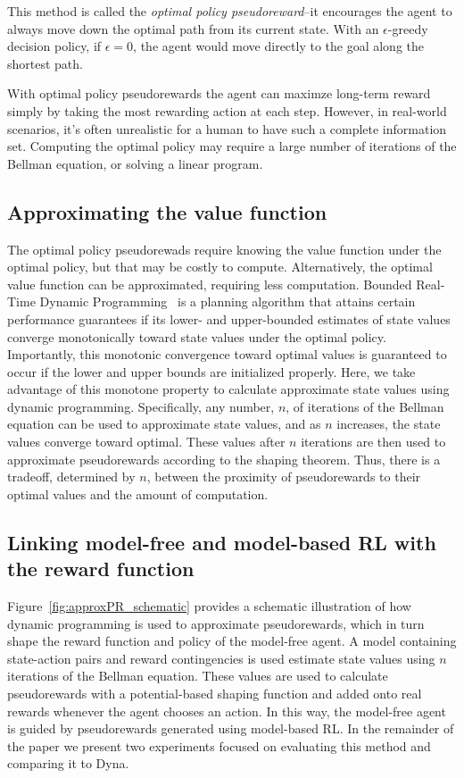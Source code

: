 \documentclass[letterpaper]{article}
\begin{document}
This method is called the \textit{optimal policy pseudoreward}--it encourages the agent to always move down the optimal path from its current state. With an $\epsilon$-greedy decision policy, if $\epsilon = 0$, the agent would move directly to the goal along the shortest path.

With optimal policy pseudorewards the agent can maximze long-term reward simply by taking the most rewarding action at each step. However, in real-world scenarios, it's often unrealistic for a human to have such a complete information set. Computing the optimal policy may require a large number of iterations of the Bellman equation, or solving a linear program.

\subsection{Approximating the value function}

The optimal policy pseudorewads require knowing the value function under the optimal policy, but that may be costly to compute. Alternatively, the optimal value function can be approximated, requiring less computation. Bounded Real-Time Dynamic Programming~\cite{mcmahan2005bounded} is a planning algorithm that attains certain performance guarantees if its lower- and upper-bounded estimates of state values converge monotonically toward state values under the optimal policy. Importantly, this monotonic convergence toward optimal values is guaranteed to occur if the lower and upper bounds are initialized properly. Here, we take advantage of this monotone property to calculate approximate state values using dynamic programming.  Specifically, any number, $n$, of iterations of the Bellman equation can be used to approximate state values, and as $n$ increases, the state values converge toward optimal. These values after $n$ iterations are then used to approximate pseudorewards according to the shaping theorem. Thus, there is a tradeoff, determined by $n$, between  the proximity of pseudorewards to their optimal values and the amount of computation.

\subsection{Linking model-free and model-based RL with the reward function}

Figure~\ref{fig:approxPR_schematic} provides a schematic illustration of how dynamic programming is used to approximate pseudorewards, which in turn shape the reward function and policy of the model-free agent. A model containing state-action pairs and reward contingencies is used estimate state values using $n$ iterations of the Bellman equation. These values are used to calculate pseudorewards with a potential-based shaping function and added onto real rewards whenever the agent chooses an action. In this way, the model-free agent is guided by pseudorewards generated using model-based RL. In the remainder of the paper we present two experiments focused on evaluating this method and comparing it to Dyna.
\end{document}
